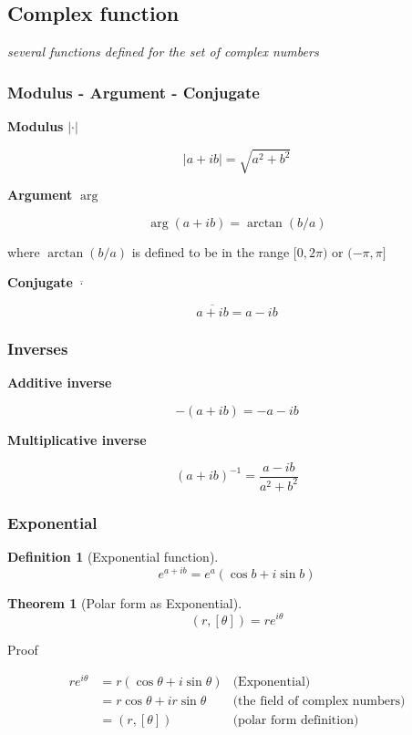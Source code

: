 \documentclass{article}
\newtheorem{theorem}{Theorem}
\newtheorem{definition}{Definition}
\begin{document}
\subsection{Complex function}
\emph{several functions defined for the set of complex numbers}

\subsubsection{Modulus - Argument - Conjugate}

\textbf{Modulus} $|\cdot|$

$$
    |a + ib| = \sqrt{a^2 + b^2}
$$

\textbf{Argument} $\arg$

$$
    \arg (a + ib) = \arctan (b/a)
$$

where $\arctan (b/a)$ is defined to be in the range $[0, 2\pi)$ or $(-\pi, \pi]$

\textbf{Conjugate} $\overline{\cdot}$

$$
    \overline{a + ib} = a - ib
$$

\subsubsection{Inverses}

\noindent
\textbf{Additive inverse}

$$
    - (a + ib) = - a - ib
$$

\textbf{Multiplicative inverse}

$$
    (a + ib)^{-1} = \frac{a - ib}{a^2 + b^2}
$$

\subsubsection{Exponential}

\begin{definition}[Exponential function]
$$
    e^{a + ib} = e^a (\cos b + i \sin b)
$$    
\end{definition}

\begin{theorem}[Polar form as Exponential]
$$
    (r, [\theta]) = r e^{i\theta}
$$
\end{theorem}

Proof

\begin{align*}
    r e^{i\theta}   &= r (\cos \theta + i \sin \theta) &\text{(Exponential)}\\
                    &= r \cos \theta + i r \sin \theta &\text{(the field of complex numbers)}\\
                    &= (r, [\theta]) &\text{(polar form definition)}\\
\end{align*}
\end{document}
